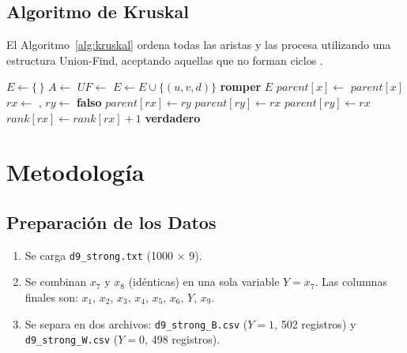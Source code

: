 \documentclass[12pt, a4paper]{article}
\begin{document}
\subsection{Algoritmo de Kruskal}

El Algoritmo~\ref{alg:kruskal} ordena todas las aristas y las procesa
utilizando una estructura Union-Find, aceptando aquellas que no forman
ciclos \cite{kruskal1956}.

\begin{algorithm}[H]
\caption{Kruskal con Union-Find}\label{alg:kruskal}
\begin{algorithmic}[1]
    \State $E \gets \{\,\}$
    \State $A \gets$ 
    \State $UF \gets$  
            \State {}
            \State $E \gets E \cup \{(u, v, d)\}$
             \State \textbf{romper} \EndIf
        \EndIf
    \EndFor
    \State \Return $E$
\EndFunction
\Statex
{} 
        \State $parent[x] \gets$ 
    \EndIf
    \State \Return $parent[x]$
\EndFunction
\Statex
{}
    \State $rx \gets$ , $ry \gets$ 
     \State \Return \textbf{falso} \EndIf
        \State $parent[rx] \gets ry$
        \State $parent[ry] \gets rx$
    \Else
        \State $parent[ry] \gets rx$
        \State $rank[rx] \gets rank[rx] + 1$
    \EndIf
    \State \Return \textbf{verdadero}
\EndFunction
\end{algorithmic}
\end{algorithm}

\section{Metodología}

\subsection{Preparación de los Datos}

\begin{enumerate}
    \item Se carga \texttt{d9\_strong.txt} (1000 $\times$ 9).
    \item Se combinan $x_7$ y $x_8$ (idénticas) en una sola variable
          $Y = x_7$. Las columnas finales son: $x_1$, $x_2$, $x_3$,
          $x_4$, $x_5$, $x_6$, $Y$, $x_9$.
    \item Se separa en dos archivos: \texttt{d9\_strong\_B.csv}
          ($Y = 1$, 502 registros) y \texttt{d9\_strong\_W.csv}
          ($Y = 0$, 498 registros).
\end{enumerate}
\end{document}
